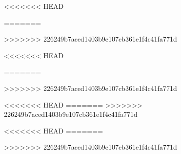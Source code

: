 \usepackage[T1]{fontenc}
\usepackage{amssymb,amsmath}
\usepackage{txfonts}
\usepackage{microtype}
<<<<<<< HEAD

\usepackage{graphicx}
\usepackage{subfigure} 
=======
\usepackage{xspace}
\xspaceaddexceptions{\%}

\usepackage{paralist}

\usepackage{graphicx}
\usepackage{subfig} 
>>>>>>> 226249b7aced1403b9e107cb361e1f4c41fa771d

\usepackage{natbib}

\usepackage{algorithm}
\usepackage{algorithmic}

<<<<<<< HEAD
\usepackage{hyperref}
\usepackage{url}
=======
\usepackage[hyphens]{url}
\usepackage{hyperref}
>>>>>>> 226249b7aced1403b9e107cb361e1f4c41fa771d

\newcommand{\theHalgorithm}{\arabic{algorithm}}


\usepackage{mlp2020}
<<<<<<< HEAD
=======
>>>>>>> 226249b7aced1403b9e107cb361e1f4c41fa771d



\DeclareMathOperator{\softmax}{softmax}
\DeclareMathOperator{\sigmoid}{sigmoid}
\DeclareMathOperator{\sgn}{sgn}
\DeclareMathOperator{\relu}{relu}
\DeclareMathOperator{\lrelu}{lrelu}
\DeclareMathOperator{\elu}{elu}
\DeclareMathOperator{\selu}{selu}
\DeclareMathOperator{\maxout}{maxout}
<<<<<<< HEAD
=======





>>>>>>> 226249b7aced1403b9e107cb361e1f4c41fa771d
